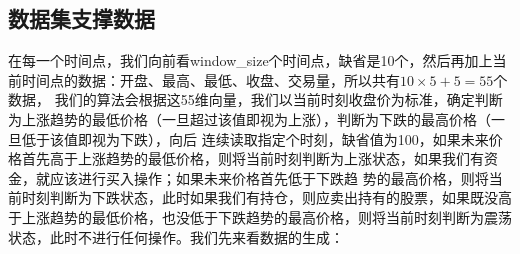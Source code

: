 \subsection{数据集支撑数据}
在每一个时间点，我们向前看window\_size个时间点，缺省是10个，然后再加上当前时间点的数据：开盘、最高、最低、收盘、交易量，所以共有$10 \times 5 + 5 = 55$个数据，
我们的算法会根据这55维向量，我们以当前时刻收盘价为标准，确定判断为上涨趋势的最低价格（一旦超过该值即视为上涨），判断为下跌的最高价格（一旦低于该值即视为下跌），向后
连续读取指定个时刻，缺省值为100，如果未来价格首先高于上涨趋势的最低价格，则将当前时刻判断为上涨状态，如果我们有资金，就应该进行买入操作；如果未来价格首先低于下跌趋
势的最高价格，则将当前时刻判断为下跌状态，此时如果我们有持仓，则应卖出持有的股票，如果既没高于上涨趋势的最低价格，也没低于下跌趋势的最高价格，则将当前时刻判断为震荡
状态，此时不进行任何操作。我们先来看数据的生成：
